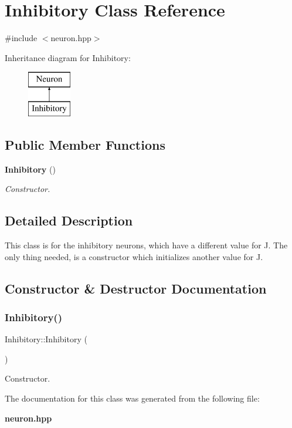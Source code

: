 \section{Inhibitory Class Reference}
\label{class_inhibitory}


{\ttfamily \#include $<$neuron.\+hpp$>$}

Inheritance diagram for Inhibitory\+:\begin{figure}[H]
\begin{center}
\leavevmode
\includegraphics[height=2.000000cm]{class_inhibitory}
\end{center}
\end{figure}
\subsection*{Public Member Functions}
\begin{DoxyCompactItemize}
\item 
\textbf{ Inhibitory} ()
\begin{DoxyCompactList}\small\item\em Constructor. \end{DoxyCompactList}\end{DoxyCompactItemize}


\subsection{Detailed Description}
This class is for the inhibitory neurons, which have a different value for J. The only thing needed, is a constructor which initializes another value for J. 

\subsection{Constructor \& Destructor Documentation}
\mbox{\label{class_inhibitory_ae5bde3aa2eabeb2a6bb91deb6b9e6a1c}} 
\subsubsection{Inhibitory()}
{\footnotesize\ttfamily Inhibitory\+::\+Inhibitory (\begin{DoxyParamCaption}{ }\end{DoxyParamCaption})\hspace{0.3cm}{\ttfamily [inline]}}



Constructor. 



The documentation for this class was generated from the following file\+:\begin{DoxyCompactItemize}
\item 
\textbf{ neuron.\+hpp}\end{DoxyCompactItemize}
